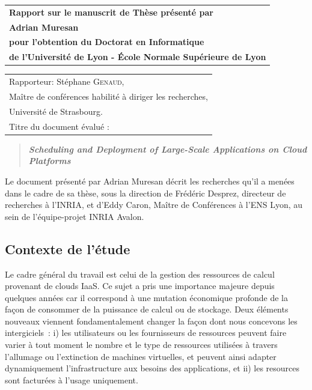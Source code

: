 \documentclass[a4paper,12pt]{article}
\begin{document}
\begin{flushleft}
\begin{tabular}[t]{l}
\Large\textsf{\textbf{Rapport sur le manuscrit de Thèse présenté par}}\\[4mm]
\Large\textsf{\textbf{Adrian Muresan}}\\[4mm]
\large\textsf{\textbf{pour l'obtention du Doctorat en Informatique}}\\
\large\textsf{\textbf{de l'Université de Lyon - \'Ecole Normale Supérieure de Lyon}}\\
\end{tabular}


\noindent%
\begin{tabular}[t]{l}
Rapporteur: Stéphane \textsc{Genaud},\\
Maître de conférences habilité à diriger les recherches,\\
Université de Strasbourg.\\[3mm]
Titre du document évalué :\\[1mm]
\end{tabular}%

\begin{quote}
\Large \textit{\textsf{\textbf{
Scheduling and Deployment of Large-Scale Applications on Cloud Platforms
}}}
\end{quote}

\end{flushleft}

\vspace{5mm}

Le document  présenté par Adrian  Muresan décrit  les recherches qu'il  a menées
dans le cadre de  sa thèse, sous la direction de  Frédéric Desprez, directeur de
recherches à  l'INRIA, et d'Eddy Caron,  Maître de Conférences à  l'ENS Lyon, au
sein de l'équipe-projet INRIA Avalon.


\subsection*{Contexte de l'étude}
\vspace{-3mm}
Le cadre  général du travail  est celui de la  gestion des ressources  de calcul
provenant  de clouds  IaaS.   Ce  sujet a  pris  une  importance majeure  depuis
quelques années car il correspond à une mutation économique profonde de la façon
de consommer de  la puissance de calcul ou de  stockage.  Deux éléments nouveaux
viennent   fondamentalement   changer  la   façon   dont   nous  concevons   les
intergiciels~: i)  les utilisateurs  ou les  fournisseurs de  ressources peuvent
faire  varier à  tout moment  le nombre  et le  type de  ressources utilisées  à
travers  l'allumage ou  l'extinction de  machines virtuelles,  et peuvent  ainsi
adapter dynamiquement l'infrastructure aux besoins  des applications, et ii) les
resources sont facturées à l'usage uniquement.
\end{document}

